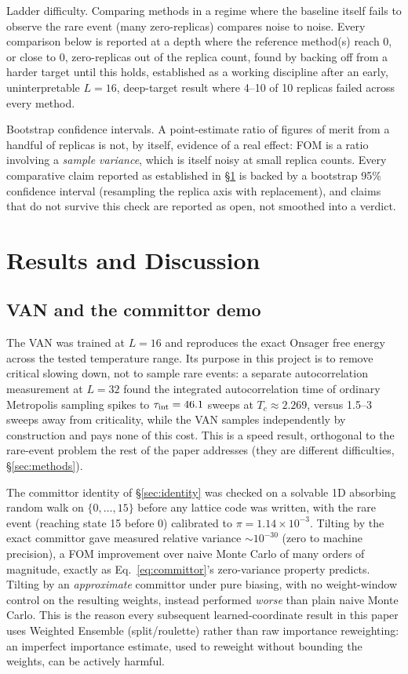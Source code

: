 \documentclass[a4paper,fleqn]{cas-sc}
\begin{document}
Ladder difficulty. Comparing methods in a regime where the baseline itself fails
to observe the rare event (many zero-replicas) compares noise to noise. Every comparison
below is reported at a depth where the reference method(s) reach 0, or close to 0,
zero-replicas out of the replica count, found by backing off from a harder target until
this holds, established as a working discipline after an early, uninterpretable
$L=16$, deep-target result where 4--10 of 10 replicas failed across every method.

Bootstrap confidence intervals. A point-estimate ratio of figures of merit from a
handful of replicas is not, by itself, evidence of a real effect: FOM is a ratio
involving a \emph{sample variance}, which is itself noisy at small replica counts. Every
comparative claim reported as established in \S\ref{sec:results} is backed by a bootstrap
95\% confidence interval (resampling the replica axis with replacement), and claims that do
not survive this check are reported as open, not smoothed into a verdict.

\FloatBarrier

\section{Results and Discussion}\label{sec:results}

\subsection{VAN and the committor demo}\label{sec:res-van}
The VAN was trained at $L=16$ and reproduces the exact Onsager free energy across the
tested temperature range. Its purpose in this project is to remove critical slowing down,
not to sample rare events: a separate autocorrelation measurement at $L=32$ found the
integrated autocorrelation time of ordinary Metropolis sampling spikes to $\tau_{\rm
	int}=46.1$ sweeps at $T_c\approx2.269$, versus 1.5--3 sweeps away from criticality, while
the VAN samples independently by construction and pays none of this cost. This is a speed
result, orthogonal to the rare-event problem the rest of the paper addresses (they are
different difficulties, \S\ref{sec:methods}).

The committor identity of \S\ref{sec:identity} was checked on a solvable 1D absorbing
random walk on $\{0,\dots,15\}$ before any lattice code was written, with the rare event
(reaching state 15 before 0) calibrated to $\pi=1.14\times10^{-3}$. Tilting by the exact
committor gave measured relative variance $\sim10^{-30}$ (zero to machine precision), a
FOM improvement over naive Monte Carlo of many orders of magnitude, exactly as
Eq.~\eqref{eq:committor}'s zero-variance property predicts. Tilting by an
\emph{approximate} committor under pure biasing, with no weight-window control on the
resulting weights, instead performed \emph{worse} than plain naive Monte Carlo. This is
the reason every subsequent learned-coordinate result in this paper uses Weighted
Ensemble (split/roulette) rather than raw importance reweighting: an imperfect importance
estimate, used to reweight without bounding the weights, can be actively harmful.
\end{document}
